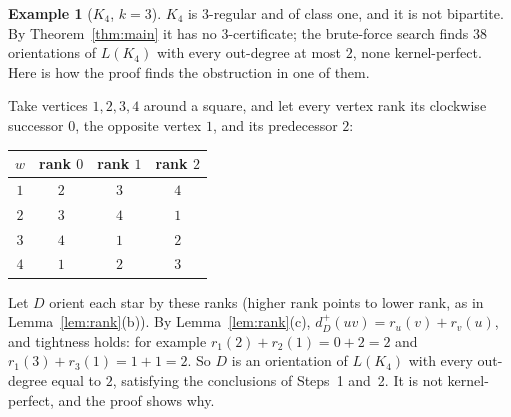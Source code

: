 \documentclass[11pt]{article}
\theoremstyle{plain}
\theoremstyle{definition}
\newtheorem{example}[theorem]{Example}
\theoremstyle{remark}
\newcommand{\dout}{d^{+}}
\begin{document}
\begin{example}[$K_4$, $k=3$]\label{ex:k4}
$K_4$ is $3$-regular and of class one, and it is not bipartite. By Theorem~\ref{thm:main} it has
no $3$-certificate; the brute-force search finds $38$ orientations of $L(K_4)$ with every
out-degree at most $2$, none kernel-perfect. Here is how the proof finds the obstruction in one
of them.

Take vertices $1,2,3,4$ around a square, and let every vertex rank its clockwise successor $0$,
the opposite vertex $1$, and its predecessor $2$:
\begin{center}
\begin{tabular}{@{}cccc@{}}
\toprule
$w$ & rank $0$ & rank $1$ & rank $2$ \\
\midrule
$1$ & $2$ & $3$ & $4$ \\
$2$ & $3$ & $4$ & $1$ \\
$3$ & $4$ & $1$ & $2$ \\
$4$ & $1$ & $2$ & $3$ \\
\bottomrule
\end{tabular}
\end{center}
Let $D$ orient each star by these ranks (higher rank points to lower rank, as in
Lemma~\ref{lem:rank}(b)). By Lemma~\ref{lem:rank}(c), $\dout_D(uv)=r_u(v)+r_v(u)$, and tightness
holds: for example $r_1(2)+r_2(1)=0+2=2$ and $r_1(3)+r_3(1)=1+1=2$. So $D$ is an orientation of
$L(K_4)$ with every out-degree equal to $2$, satisfying the conclusions of Steps~1 and~2. It is
not kernel-perfect, and the proof shows why.


\end{example}
\end{document}
